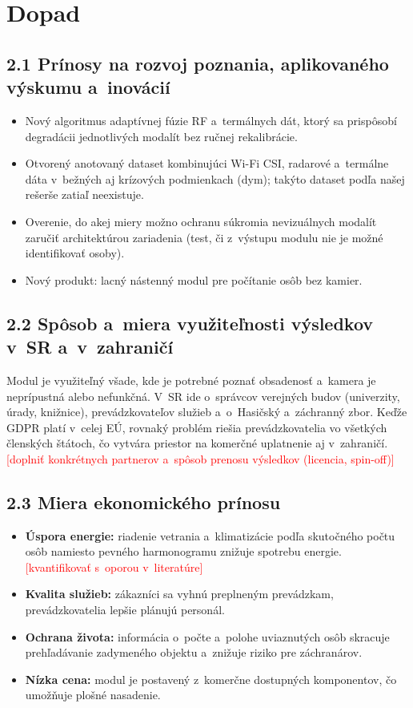 \documentclass[11pt,a4paper]{article}
\newcommand{\doplnit}[1]{\textcolor{red}{[#1]}}
\begin{document}
\section{Dopad}

\subsection*{2.1 Prínosy na rozvoj poznania, aplikovaného výskumu a~inovácií}
\begin{itemize}
\item Nový algoritmus adaptívnej fúzie RF a~termálnych dát, ktorý sa prispôsobí degradácii jednotlivých modalít bez ručnej rekalibrácie.
\item Otvorený anotovaný dataset kombinujúci Wi-Fi CSI, radarové a~termálne dáta v~bežných aj krízových podmienkach (dym); takýto dataset podľa našej rešerše zatiaľ neexistuje.
\item Overenie, do akej miery možno ochranu súkromia nevizuálnych modalít zaručiť architektúrou zariadenia (test, či z~výstupu modulu nie je možné identifikovať osoby).
\item Nový produkt: lacný nástenný modul pre počítanie osôb bez kamier.
\end{itemize}

\subsection*{2.2 Spôsob a~miera využiteľnosti výsledkov v~SR a~v~zahraničí}
Modul je využiteľný všade, kde je potrebné poznať obsadenosť a~kamera je neprípustná alebo nefunkčná. V~SR ide o~správcov verejných budov (univerzity, úrady, knižnice), prevádzkovateľov služieb a~o~Hasičský a~záchranný zbor. Keďže GDPR platí v~celej EÚ, rovnaký problém riešia prevádzkovatelia vo všetkých členských štátoch, čo vytvára priestor na komerčné uplatnenie aj v~zahraničí. \doplnit{doplniť konkrétnych partnerov a~spôsob prenosu výsledkov (licencia, spin-off)}

\subsection*{2.3 Miera ekonomického prínosu}
\begin{itemize}
\item \textbf{Úspora energie:} riadenie vetrania a~klimatizácie podľa skutočného počtu osôb namiesto pevného harmonogramu znižuje spotrebu energie. \doplnit{kvantifikovať s~oporou v~literatúre}
\item \textbf{Kvalita služieb:} zákazníci sa vyhnú preplneným prevádzkam, prevádzkovatelia lepšie plánujú personál.
\item \textbf{Ochrana života:} informácia o~počte a~polohe uviaznutých osôb skracuje prehľadávanie zadymeného objektu a~znižuje riziko pre záchranárov.
\item \textbf{Nízka cena:} modul je postavený z~komerčne dostupných komponentov, čo umožňuje plošné nasadenie.
\end{itemize}
\end{document}
